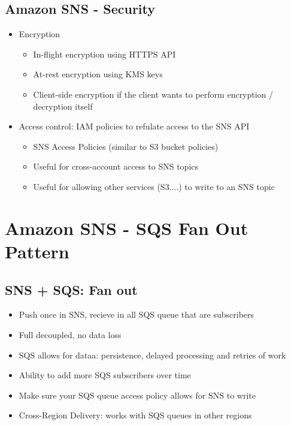 \subsection{Amazon SNS - Security}

\begin{itemize}
    \item Encryption
    \begin{itemize}
        \item In-flight encryption using HTTPS API
        \item At-rest encryption using KMS keys
        \item Client-side encryption if the client wants to perform encryption / decryption itself
    \end{itemize}
    \item Access control: IAM policies to refulate access to the SNS API
    \begin{itemize}
        \item SNS Access Policies (similar to S3 bucket policies)
        \item Useful for cross-account access to SNS topics
        \item Useful for allowing other services (S3....) to write to an SNS topic
    \end{itemize}
\end{itemize}


\section{Amazon SNS - SQS Fan Out Pattern}

\subsection{SNS + SQS: Fan out}
\begin{itemize}
    \item Push once in SNS, recieve in all SQS queue that are subscribers
    \item Full decoupled, no data loss
    \item SQS allows for dataa: persistence, delayed processing and retries of work
    \item Ability to add more SQS subscribers over time
    \item Make sure your SQS queue access policy allows for SNS to write
    \item Cross-Region Delivery: works with SQS queues in other regions
\end{itemize}

